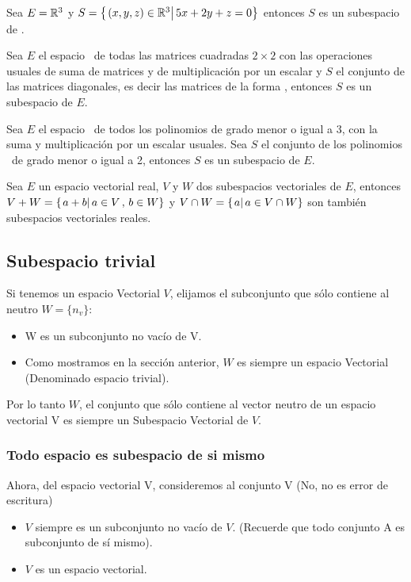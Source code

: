 \begin{ejemplo}
Sea $E = \mathbb{R}^3$ y $S = \left\{ \left. (x, y, z) \in \mathbb{R}^3\right| 5x + 2y + z = 0 \right\}$ entonces $S$ es un subespacio de \rtres.
\end{ejemplo}

\begin{ejemplo}
Sea $E$ el espacio \mdosxdos \ de todas las matrices cuadradas $2 \times 2$ con las operaciones usuales de suma de matrices y de multiplicación por un escalar y $S$ el conjunto de las matrices diagonales, es decir las matrices de la forma , entonces $S$ es un subespacio de $E$.

\end{ejemplo}

\begin{ejemplo}
Sea $E$ el espacio \ptres \ de todos los polinomios de grado menor o igual a 3, con la suma y multiplicación por un escalar usuales. Sea $S$ el conjunto de los polinomios \pdos \ de grado menor o igual a 2, entonces $S$ es un subespacio de $E$.
\end{ejemplo}

\begin{ejemplo}

Sea $E$ un espacio vectorial real, $V$ y $W$ dos subespacios vectoriales de $E$, entonces $V + W =\left\{ \left. a+b\right| a \in V \, , \, b \in W \right\}$ y $V \cap W = \left\{ \left. a\right| a \in V \cap W \right\}$ son también subespacios vectoriales reales.
\end{ejemplo}



\subsection{Subespacio trivial}
Si tenemos un espacio Vectorial $V$, elijamos el subconjunto que s\'olo contiene al neutro
$W=\lbrace n_v\rbrace$:
~\\	
\begin{itemize}
 \item W es un subconjunto no vac\'io de V.
\item Como mostramos en la sección anterior, $W$ es siempre un espacio Vectorial (Denominado espacio trivial).
 \end{itemize} 
Por lo tanto $W$, el conjunto que s\'olo contiene al vector neutro de un espacio vectorial V es siempre un Subespacio Vectorial de $V$.
\subsubsection{Todo espacio es subespacio de si mismo}
Ahora, del espacio vectorial V, consideremos al conjunto V (No, no es error de escritura)
\begin{itemize}
\item $V$ siempre es un subconjunto no vac\'io de $V$. (Recuerde que todo conjunto A es subconjunto de s\'i mismo).
\item $V$ es un espacio vectorial.
\end{itemize}

